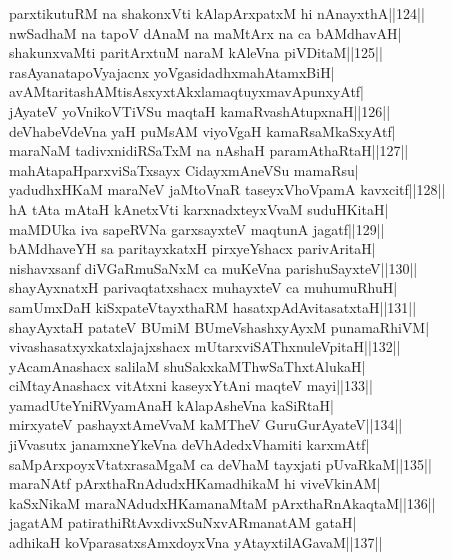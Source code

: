 \documentclass{article}
\begin{document}
parxtikutuRM na shakonxVti kAlapArxpatxM hi nAnayxthA||124||\\
nwSadhaM na tapoV dAnaM na maMtArx na ca bAMdhavAH|\\
shakunxvaMti paritArxtuM naraM kAleVna piVDitaM||125||\\
rasAyanatapoVyajacnx yoVgasidadhxmahAtamxBiH|\\
avAMtaritashAMtisAsxyxtAkxlamaqtuyxmavApunxyAtf|\\
jAyateV yoVnikoVTiVSu maqtaH kamaRvashAtupxnaH||126||\\
deVhabeVdeVna yaH puMsAM viyoVgaH kamaRsaMkaSxyAtf|\\
maraNaM tadivxnidiRSaTxM na nAshaH paramAthaRtaH||127||\\
mahAtapaHparxviSaTxsayx CidayxmAneVSu mamaRsu|\\
yadudhxHKaM maraNeV jaMtoVnaR taseyxVhoVpamA kavxcitf||128||\\
hA tAta mAtaH kAnetxVti karxnadxteyxVvaM suduHKitaH|\\
maMDUka iva sapeRVNa garxsayxteV maqtunA jagatf||129||\\
bAMdhaveYH sa paritayxkatxH pirxyeYshacx parivAritaH|\\
nishavxsanf diVGaRmuSaNxM ca muKeVna parishuSayxteV||130||\\
shayAyxnatxH parivaqtatxshacx muhayxteV ca muhumuRhuH|\\
samUmxDaH kiSxpateVtayxthaRM hasatxpAdAvitasatxtaH||131||\\
shayAyxtaH patateV BUmiM BUmeVshashxyAyxM punamaRhiVM|\\
vivashasatxyxkatxlajajxshacx mUtarxviSAThxnuleVpitaH||132||\\
yAcamAnashacx salilaM shuSakxkaMThwSaThxtAlukaH|\\
ciMtayAnashacx vitAtxni kaseyxYtAni maqteV mayi||133||\\
yamadUteYniRVyamAnaH kAlapAsheVna kaSiRtaH|\\
mirxyateV pashayxtAmeVvaM kaMTheV GuruGurAyateV||134||\\
jiVvasutx janamxneYkeVna deVhAdedxVhamiti karxmAtf|\\
saMpArxpoyxVtatxrasaMgaM ca deVhaM tayxjati pUvaRkaM||135||\\
maraNAtf pArxthaRnAdudxHKamadhikaM hi viveVkinAM|\\
kaSxNikaM maraNAdudxHKamanaMtaM pArxthaRnAkaqtaM||136||\\
jagatAM patirathiRtAvxdivxSuNxvARmanatAM gataH|\\
adhikaH koVparasatxsAmxdoyxVna yAtayxtilAGavaM||137||\\
\end{document}
